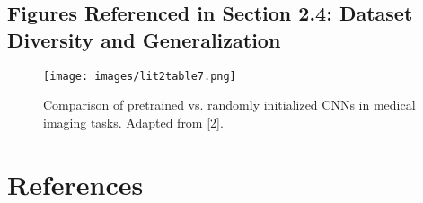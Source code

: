 \documentclass[12pt]{article}
\begin{document}
\subsection{Figures Referenced in Section 2.4: Dataset Diversity and Generalization}

\begin{figure}[H]
    \centering
    \texttt{[image: images/lit2table7.png]}
    \caption{Comparison of pretrained vs. randomly initialized CNNs in medical imaging tasks. Adapted from [2].}
    \label{fig:lit2table7}
\end{figure}

\newpage
\section{References}
\end{document}
